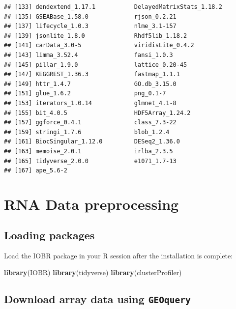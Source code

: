 \documentclass[
  12pt,
]{book}
\newenvironment{Shaded}{\begin{snugshade}}{\end{snugshade}}
\newcommand{\FunctionTok}[1]{\textcolor[rgb]{0.13,0.29,0.53}{\textbf{#1}}}
\newcommand{\NormalTok}[1]{#1}
\begin{document}
\begin{verbatim}
## [133] dendextend_1.17.1           DelayedMatrixStats_1.18.2  
## [135] GSEABase_1.58.0             rjson_0.2.21               
## [137] lifecycle_1.0.3             nlme_3.1-157               
## [139] jsonlite_1.8.0              Rhdf5lib_1.18.2            
## [141] carData_3.0-5               viridisLite_0.4.2          
## [143] limma_3.52.4                fansi_1.0.3                
## [145] pillar_1.9.0                lattice_0.20-45            
## [147] KEGGREST_1.36.3             fastmap_1.1.1              
## [149] httr_1.4.7                  GO.db_3.15.0               
## [151] glue_1.6.2                  png_0.1-7                  
## [153] iterators_1.0.14            glmnet_4.1-8               
## [155] bit_4.0.5                   HDF5Array_1.24.2           
## [157] ggforce_0.4.1               class_7.3-22               
## [159] stringi_1.7.6               blob_1.2.4                 
## [161] BiocSingular_1.12.0         DESeq2_1.36.0              
## [163] memoise_2.0.1               irlba_2.3.5                
## [165] tidyverse_2.0.0             e1071_1.7-13               
## [167] ape_5.6-2
\end{verbatim}

\hypertarget{rna-data-preprocessing}{%
\chapter{\texorpdfstring{\textbf{RNA Data preprocessing}}{RNA Data preprocessing}}\label{rna-data-preprocessing}}

\hypertarget{loading-packages}{%
\section{Loading packages}\label{loading-packages}}

Load the IOBR package in your R session after the installation is complete:

\begin{Shaded}
\begin{Highlighting}[]
\FunctionTok{library}\NormalTok{(IOBR)}
\FunctionTok{library}\NormalTok{(tidyverse)}
\FunctionTok{library}\NormalTok{(clusterProfiler)}
\end{Highlighting}
\end{Shaded}

\hypertarget{download-array-data-using-geoquery}{%
\section{\texorpdfstring{Download array data using \texttt{GEOquery}}{Download array data using GEOquery}}\label{download-array-data-using-geoquery}}
\end{document}
